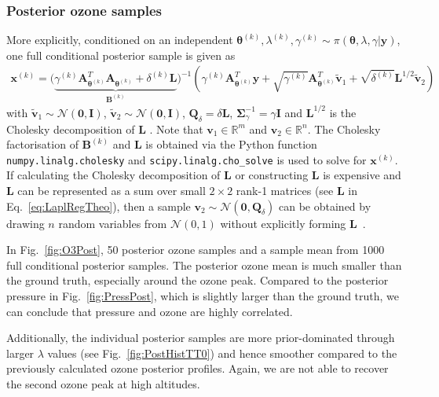 \subsubsection{Posterior ozone samples}
More explicitly, conditioned on an independent $\bm{\theta}^{(k)},\lambda^{(k)},\gamma^{(k)} \sim \pi(\bm{\theta},\lambda,\gamma | \bm{y})$, one full conditional posterior sample is given as  
\begin{align}
	\label{eq:RTOAppl}
	\bm{x}^{(k)} = 	\Big(  \underbrace{\gamma^{(k)} \bm{A}_{\bm{\theta}^{(k)}}^T\bm{A}_{\bm{\theta}^{(k)}} +  \delta^{(k)}\bm{L}}_{\bm{B}^{(k)}} \Big)^{-1} \left(  \gamma^{(k)}  \bm{A}_{\bm{\theta}^{(k)}}^T\bm{y} +\sqrt{\gamma^{(k)}} \bm{A}_{\bm{\theta}^{(k)}}^T \tilde{\bm{v}}_1 + \sqrt{\delta^{(k)}}\bm{L}^{1/2}\tilde{\bm{v}}_2\right)
\end{align}
with $\tilde{\bm{v}}_1 \sim \mathcal{N}(\bm{0},  \bm{I})$, $\tilde{\bm{v}}_2 \sim \mathcal{N}(\bm{0}, \bm{I} )$, $\bm{Q}_{\delta} = \delta  \bm{L} $, $\bm{\Sigma}^{-1}_{\gamma} = \gamma \bm{I}$ and $\bm{L}^{1/2}$ is the Cholesky decomposition of $\bm{L}$ \cite{bardsley2012mcmc}.
Note that $\bm{v}_1 \in \mathbb{R}^m$ and $\bm{v}_2 \in \mathbb{R}^n$.
The Cholesky factorisation of $\bm{B}^{(k)}$ and $\bm{L}$ is obtained via the Python function \texttt{numpy.linalg.cholesky} and \texttt{scipy.linalg.cho\_solve} is used to solve for $\bm{x}^{(k)}$.
If calculating the Cholesky decomposition of $\bm{L}$ or constructing $\bm{L}$ is expensive and $\bm{L}$ can be represented as a sum over small $2\times2$ rank-1 matrices (see $\bm{L}$ in Eq.~\ref{eq:LaplRegTheo}), then a sample $\bm{v}_2 \sim \mathcal{N}(\bm{0}, \bm{Q}_{\delta})$ can be obtained by drawing $n$ random variables from $\mathcal{N}(0,1)$ without explicitly forming $\bm{L}$~\cite{fox2016fast}.

In Fig.~\ref{fig:O3Post}, 50 posterior ozone samples and a sample mean from 1000 full conditional posterior samples.
The posterior ozone mean is much smaller than the ground truth, especially around the ozone peak.
Compared to the posterior pressure in Fig.~\ref{fig:PressPost}, which is slightly larger than the ground truth, we can conclude that pressure and ozone are highly correlated.

Additionally, the individual posterior samples are more prior-dominated through larger $\lambda$ values (see Fig.~\ref{fig:PostHistTT0}) and hence smoother compared to the previously calculated ozone posterior profiles.
Again, we are not able to recover the second ozone peak at high altitudes.


